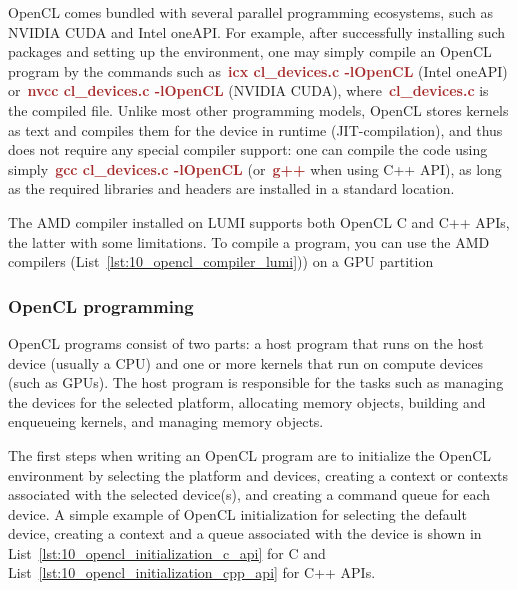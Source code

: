 \par
OpenCL comes bundled with several parallel programming ecosystems, such as NVIDIA CUDA and Intel oneAPI.
For example, after successfully installing such packages and setting up the environment, one may simply compile an OpenCL program by the commands such as~\textbf{\textcolor{brown}{icx cl\_devices.c -lOpenCL}} (Intel oneAPI) or~\textbf{\textcolor{brown}{nvcc cl\_devices.c -lOpenCL}} (NVIDIA CUDA), where~\textbf{\textcolor{brown}{cl\_devices.c}} is the compiled file.
Unlike most other programming models, OpenCL stores kernels as text and compiles them for the device in runtime (JIT-compilation), and thus does not require any special compiler support: one can compile the code using simply~\textbf{\textcolor{brown}{gcc cl\_devices.c -lOpenCL}} (or~\textbf{\textcolor{brown}{g++}} when using C++ API), as long as the required libraries and headers are installed in a standard location.


\par
The AMD compiler installed on LUMI supports both OpenCL C and C++ APIs, the latter with some limitations.
To compile a program, you can use the AMD compilers (List~\ref{lst:10_opencl_compiler_lumi})) on a GPU partition





\subsubsection{OpenCL programming}


\par
OpenCL programs consist of two parts: a host program that runs on the host device (usually a CPU) and one or more kernels that run on compute devices (such as GPUs).
The host program is responsible for the tasks such as managing the devices for the selected platform, allocating memory objects, building and enqueueing kernels, and managing memory objects.


\par
The first steps when writing an OpenCL program are to initialize the OpenCL environment by selecting the platform and devices, creating a context or contexts associated with the selected device(s), and creating a command queue for each device.
A simple example of OpenCL initialization for selecting the default device, creating a context and a queue associated with the device is shown in List~\ref{lst:10_opencl_initialization_c_api} for C and List~\ref{lst:10_opencl_initialization_cpp_api} for C++ APIs.


